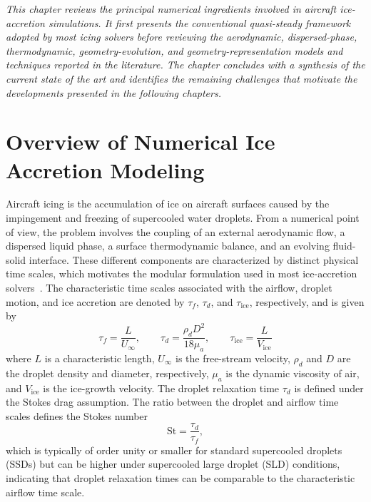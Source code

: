 \label{sec:RevLitt}

\textit{
This chapter reviews the principal numerical ingredients involved in aircraft ice-accretion simulations. It first presents the conventional quasi-steady framework adopted by most icing solvers before reviewing the aerodynamic, dispersed-phase, thermodynamic, geometry-evolution, and geometry-representation models and techniques reported in the literature. The chapter concludes with a synthesis of the current state of the art and identifies the remaining challenges that motivate the developments presented in the following chapters.
}

\section{Overview of Numerical Ice Accretion Modeling}\label{sec:review_icing_overview}

Aircraft icing is the accumulation of ice on aircraft surfaces caused by the impingement and freezing of supercooled water droplets. From a numerical point of view, the problem involves the coupling of an external aerodynamic flow, a dispersed liquid phase, a surface thermodynamic balance, and an evolving fluid-solid interface. These different components are characterized by distinct physical time scales, which motivates the modular formulation used in most ice-accretion solvers~\cite{guardoneReview}. The characteristic time scales associated with the airflow, droplet motion, and ice accretion are denoted by $\tau_f$, $\tau_d$, and $\tau_{\mathrm{ice}}$, respectively, and is given by
\begin{equation}
    \tau_f = \frac{L}{U_\infty},
    \qquad
    \tau_d = \frac{\rho_d D^2}{18\mu_a},
    \qquad
    \tau_{\mathrm{ice}} = \frac{L}{V_{\mathrm{ice}}}
\end{equation}
where $L$ is a characteristic length, $U_\infty$ is the free-stream velocity, $\rho_d$ and $D$ are the droplet density and diameter, respectively, $\mu_a$ is the dynamic viscosity of air, and $V_{\mathrm{ice}}$ is the ice-growth velocity. The droplet relaxation time $\tau_d$ is defined under the Stokes drag assumption. The ratio between the droplet and airflow time scales defines the Stokes number
\begin{equation}
    \mathrm{St} = \frac{\tau_d}{\tau_f},
\end{equation}
which is typically of order unity or smaller for standard supercooled droplets (SSDs) but can be higher under supercooled large droplet (SLD) conditions, indicating that droplet relaxation times can be comparable to the characteristic airflow time scale.

